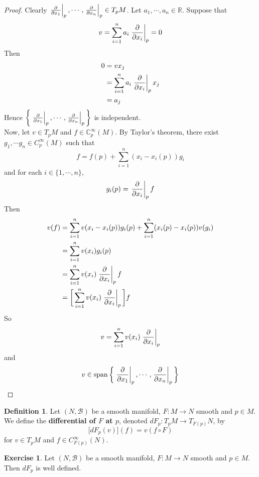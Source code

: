 \documentclass[12pt]{amsart}
\theoremstyle{definition}
\newtheorem{defn}[definition]{Definition}
\theoremstyle{definition}
\newtheorem{ex}[definition]{Exercise}
\newcommand{\C}{\mathbb{C}}
\newcommand{\R}{\mathbb{R}}
\newcommand{\MB}{\mathcal{B}}
\DeclareMathOperator{\spn}{span}
\begin{document}
	\begin{proof}
		Clearly $\eval{\pdv{x_1}}_{p}, \cdots, \eval{\pdv{x_n}}_{p} \in T_pM$. Let $a_1, \cdots, a_n \in \R$. Suppose that $$v = \sum_{i=1}^n a_i \eval{\pdv{x_i}}_{p} = 0$$
		Then 
		\begin{align*}
			0
			&= v x_j \\
			&= \sum_{i=1}^n a_i \eval{\pdv{x_i}}_{p} x_j \\
			&= a_j
		\end{align*}
		Hence $\bigg \{\eval{\pdv{x_1}}_{p}, \cdots, \eval{\pdv{x_n}}_{p} \bigg \}$ is independent.\\
		Now, let $v \in T_pM$ and $f \in \C^{\infty}_p(M)$. By Taylor's theorem, there exist $g_1, \cdots g_n \in C_p^{\infty}(M)$ such that $$f = f(p) + \sum_{i=1}^n(x_i - x_i(p)) g_i$$ and for each $i \in \{1, \cdots, n\}$, $$g_i(p) = \eval{\pdv{x_i}}_{p} f $$ Then 
		\begin{align*}
			v(f)
			&= \sum_{i=1}^nv(x_i - x_i(p)) g_i(p) + \sum_{i=1}^n(x_i(p) - x_i(p)) v(g_i) \\
			&= \sum_{i=1}^nv(x_i)g_i(p) \\
			&= \sum_{i=1}^nv(x_i)\eval{\pdv{x_i}}_{p} f \\
			&= \bigg[ \sum_{i=1}^nv(x_i)\eval{\pdv{x_i}}_{p} \bigg] f
		\end{align*}
		So $$v = \sum_{i=1}^nv(x_i)\eval{\pdv{x_i}}_{p} $$ and $$v \in \spn \bigg \{\eval{\pdv{x_1}}_{p}, \cdots, \eval{\pdv{x_n}}_{p} \bigg \}$$
	\end{proof}



	\begin{defn}
		Let $(N, \MB)$ be a smooth manifold, $F: M \rightarrow N$ smooth and $p \in M$. We define the \textbf{differential of $F$ at $p$}, denoted $dF_p: T_pM \rightarrow T_{F(p)}N$, by $$\bigg[ dF_p(v) \bigg] (f) = v (f \circ F)$$  for $v \in T_pM$ and $f \in C^{\infty}_{F(p)}(N)$.
	\end{defn}
	
	
	
	\begin{ex}
	Let $(N, \MB)$ be a smooth manifold, $F: M \rightarrow N$ smooth and $p \in M$. Then $dF_p$ is well defined.
	\end{ex}
	
\end{document}
